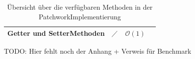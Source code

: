 \begin{table}[H]
{\begin{tabular}{|l|r|c|l|}
            Getter\textendash{} und Setter\textendash{}Methoden                           & \multicolumn{1}{|c|}{$\diagup$} & $\mathcal{O}\left(1\right)$ &                                                    \\  \hline
        \end{tabular}}
    \vspace{3pt}
    \caption{Übersicht über die verfügbaren Methoden in der Patchwork\textendash{}Implementierung}
    \label{tabelle:patchwork-methods}
\end{table}

TODO: Hier fehlt noch der Anhang + Verweis für Benchmark